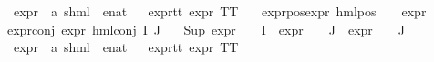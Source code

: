 \begin{isabellebody}
\isanewline
{}\isamarkupfalse%
\ expr{\isacharunderscore}{\kern0pt}{}\ {\isacharcolon}{\kern0pt}{\isacharcolon}{\kern0pt}\ {\isachardoublequoteopen}{\isacharparenleft}{\kern0pt}{\isacharprime}{\kern0pt}a{\isacharcomma}{\kern0pt}\ {\isacharprime}{\kern0pt}s{\isacharparenright}{\kern0pt}hml\ {\isasymRightarrow}\ enat{\isachardoublequoteclose}\isanewline
\ \ \isanewline
expr{\isacharunderscore}{\kern0pt}{}{\isacharunderscore}{\kern0pt}tt{\isacharcolon}{\kern0pt}\ {\isacartoucheopen}expr{\isacharunderscore}{\kern0pt}{}\ TT\ {\isacharequal}{\kern0pt}\ {}{\isacartoucheclose}\ {\isacharbar}{\kern0pt}\isanewline
expr{\isacharunderscore}{\kern0pt}{}{\isacharunderscore}{\kern0pt}pos{\isacharcolon}{\kern0pt}{\isacartoucheopen}expr{\isacharunderscore}{\kern0pt}{}\ {\isacharparenleft}{\kern0pt}hml{\isacharunderscore}{\kern0pt}pos\ {\isasymalpha}\ {\isasymphi}{\isacharparenright}{\kern0pt}\ {\isacharequal}{\kern0pt}\ expr{\isacharunderscore}{\kern0pt}{}\ {\isasymphi}{\isacartoucheclose}{\isacharbar}{\kern0pt}\isanewline
expr{\isacharunderscore}{\kern0pt}{}{\isacharunderscore}{\kern0pt}conj{\isacharcolon}{\kern0pt}\ {\isacartoucheopen}expr{\isacharunderscore}{\kern0pt}{}\ {\isacharparenleft}{\kern0pt}hml{\isacharunderscore}{\kern0pt}conj\ I\ J\ {\isasymPhi}{\isacharparenright}{\kern0pt}\ {\isacharequal}{\kern0pt}\ \isanewline
{\isacharparenleft}{\kern0pt}Sup\ {\isacharparenleft}{\kern0pt}{\isacharparenleft}{\kern0pt}expr{\isacharunderscore}{\kern0pt}{}\ {\isasymcirc}\ {\isasymPhi}{\isacharparenright}{\kern0pt}\ {\isacharbackquote}{\kern0pt}\ I\ {\isasymunion}\ {\isacharparenleft}{\kern0pt}expr{\isacharunderscore}{\kern0pt}{}\ {\isasymcirc}\ {\isasymPhi}{\isacharparenright}{\kern0pt}\ {\isacharbackquote}{\kern0pt}\ J\ {\isasymunion}\ {\isacharparenleft}{\kern0pt}expr{\isacharunderscore}{\kern0pt}{}\ {\isasymcirc}\ {\isasymPhi}{\isacharparenright}{\kern0pt}\ {\isacharbackquote}{\kern0pt}\ J{\isacharparenright}{\kern0pt}{\isacharparenright}{\kern0pt}{\isacartoucheclose}\isanewline
\isanewline
{}\isamarkupfalse%
\ expr{\isacharunderscore}{\kern0pt}{}\ {\isacharcolon}{\kern0pt}{\isacharcolon}{\kern0pt}\ {\isachardoublequoteopen}{\isacharparenleft}{\kern0pt}{\isacharprime}{\kern0pt}a{\isacharcomma}{\kern0pt}\ {\isacharprime}{\kern0pt}s{\isacharparenright}{\kern0pt}hml\ {\isasymRightarrow}\ enat{\isachardoublequoteclose}\isanewline
\ \ \isanewline
expr{\isacharunderscore}{\kern0pt}{}{\isacharunderscore}{\kern0pt}tt{\isacharcolon}{\kern0pt}\ {\isacartoucheopen}expr{\isacharunderscore}{\kern0pt}{}\ TT\ {\isacharequal}{\kern0pt}\ {}{\isacartoucheclose}\ {\isacharbar}{\kern0pt}\isanewline

\end{isabellebody}
